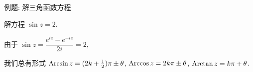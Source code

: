 \begin{frame}{例题: 解三角函数方程}
	\onslide<+->
	\begin{example}
		解方程 $\sin z=2$.
	\end{example}

	\onslide<+->
	\begin{solution}
	由于 $\sin z=\dfrac{e^{iz}-e^{-iz}}{2i}=2$,
	\onslide<+->{
		\[z=-i\Ln[(2\pm\sqrt 3)i]=\left(2k+\half\right)\pi\pm i\ln(2+\sqrt3),\quad k\in\BZ.\]}
	\vspace{-\baselineskip}
	\end{solution}
	\onslide<+->
	我们总有形式
	$\operatorname{Arcsin} z=(2k+\frac{1}{2})\pi\pm \theta$,
	$\operatorname{Arccos} z=2k\pi\pm \theta$,
	$\operatorname{Arctan} z=k\pi+\theta$.
\end{frame}

